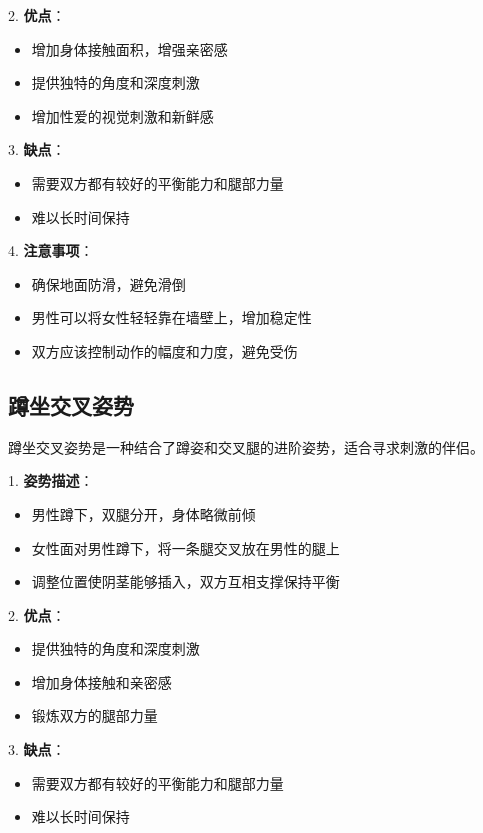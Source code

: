 \documentclass[12pt,UTF8]{ctexbook}
\begin{document}
2. \textbf{优点}：
  \begin{itemize}
  \item 增加身体接触面积，增强亲密感
  \item 提供独特的角度和深度刺激
  \item 增加性爱的视觉刺激和新鲜感
  \end{itemize}

3. \textbf{缺点}：
  \begin{itemize}
  \item 需要双方都有较好的平衡能力和腿部力量
  \item 难以长时间保持
  \end{itemize}

4. \textbf{注意事项}：
  \begin{itemize}
  \item 确保地面防滑，避免滑倒
  \item 男性可以将女性轻轻靠在墙壁上，增加稳定性
  \item 双方应该控制动作的幅度和力度，避免受伤
  \end{itemize}

\subsection{蹲坐交叉姿势}

蹲坐交叉姿势是一种结合了蹲姿和交叉腿的进阶姿势，适合寻求刺激的伴侣。

1. \textbf{姿势描述}：
  \begin{itemize}
  \item 男性蹲下，双腿分开，身体略微前倾
  \item 女性面对男性蹲下，将一条腿交叉放在男性的腿上
  \item 调整位置使阴茎能够插入，双方互相支撑保持平衡
  \end{itemize}

2. \textbf{优点}：
  \begin{itemize}
  \item 提供独特的角度和深度刺激
  \item 增加身体接触和亲密感
  \item 锻炼双方的腿部力量
  \end{itemize}

3. \textbf{缺点}：
  \begin{itemize}
  \item 需要双方都有较好的平衡能力和腿部力量
  \item 难以长时间保持
  \end{itemize}
\end{document}
